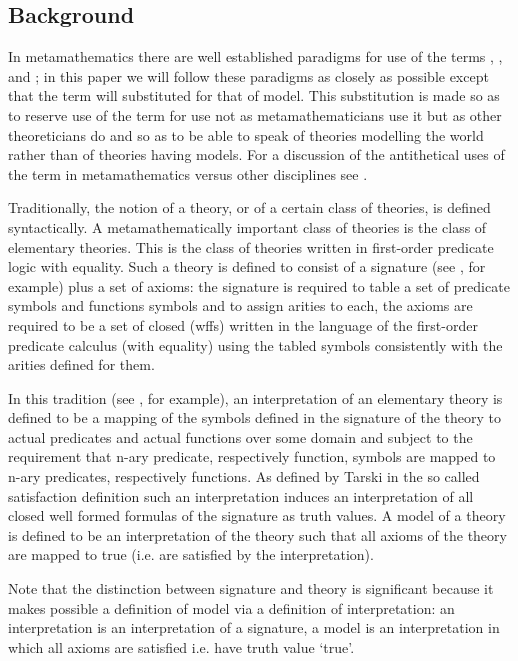 \subsection{Background}
In metamathematics there are well established paradigms for use of the terms
, ,  and ;
in this paper  we will follow these paradigms as closely as possible except that the term  will substituted  for that of model. 
This substitution is made so as to reserve use of the term  for  use not as metamathematicians 
use it but as other theoreticians do and so as to be able to speak of theories modelling 
the world rather than of theories having models. For a discussion of the antithetical uses of the term 
 in metamathematics versus other disciplines see \cite{HodgesModelTheory}.

Traditionally, the notion of a theory, or of a certain class of theories, is  defined syntactically.
A metamathematically important class of theories  is the class of elementary theories. 
This is the class of theories written in first-order predicate logic with equality. 
Such a theory is defined to consist of a signature (see \cite{HodgesModelTheory}, for example) plus a set of axioms: 
the signature is required to table a set of predicate symbols and functions symbols and to assign arities to each, 
the axioms are required  to be a set of closed  (wffs) written
in the language of the first-order predicate calculus (with equality)
using the tabled  symbols  consistently with the arities defined for them. 

In this tradition (see \cite{Mendelson}, for example), an interpretation of an elementary theory is defined to be a mapping of the symbols defined in the signature 
of the theory to actual predicates and actual functions over some domain and subject to the requirement that n-ary predicate, respectively function, symbols are mapped to n-ary predicates, respectively functions.
As defined by Tarski in the so called satisfaction definition
such an interpretation induces an interpretation of all
closed well formed formulas of the signature as truth values. 
A model of a theory is defined to be an interpretation of the theory such that all axioms of the theory are mapped to true (i.e. are satisfied by the interpretation). 

Note that the distinction between signature and theory is significant because it makes possible a definition of model 
via a definition of interpretation: an interpretation is an interpretation of a signature, 
a model is an interpretation in which all axioms are satisfied i.e. have truth value `true'.   



